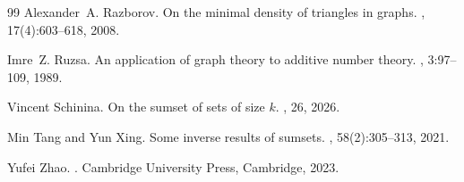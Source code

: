 \begin{thebibliography}{99}
Alexander~A. Razborov.
\newblock On the minimal density of triangles in graphs.
, 17(4):603--618, 2008.

Imre~Z. Ruzsa.
\newblock An application of graph theory to additive number theory.
, 3:97--109, 1989.

Vincent Schinina.
\newblock On the sumset of sets of size $k$.
, 26, 2026.

Min Tang and Yun Xing.
\newblock Some inverse results of sumsets.
, 58(2):305--313, 2021.

Yufei Zhao.
.
\newblock Cambridge University Press, Cambridge, 2023.

\end{thebibliography}
